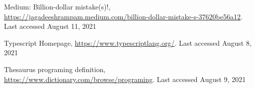 \documentclass[letterpaper,runningheads]{llncs}
\begin{document}
\begin{thebibliography}{1}
 Medium: Billion-dollar mistake(s)!, \href{https://jagadeeshrampam.medium.com/billion-dollar-mistake-s-37620be56a12}{https://jagadeeshrampam.medium.com/billion-dollar-mistake-s-37620be56a12}. Last accessed August 11, 2021

 Typescript Homepage, \href{https://www.typescriptlang.org/}{https://www.typescriptlang.org/}. Last accessed August 8, 2021

 Thesaurus programing definition, \href{https://www.dictionary.com/browse/programing}{https://www.dictionary.com/browse/programing}. Last accessed August 9, 2021
\end{thebibliography}
\end{document}
